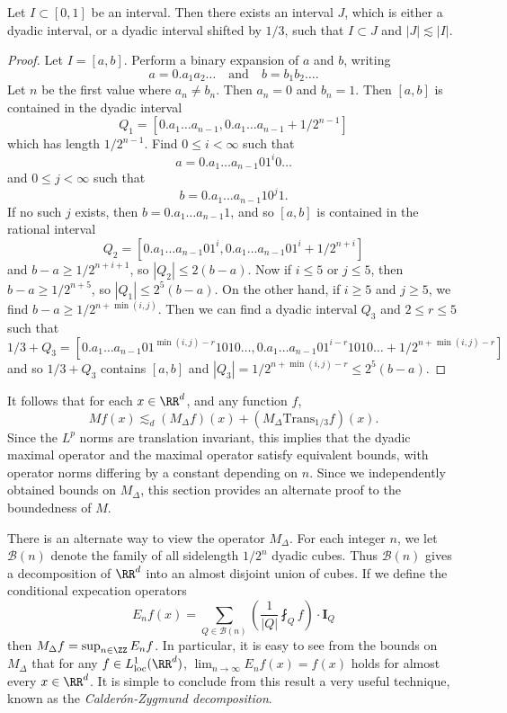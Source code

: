 \begin{lemma}
  Let $I \subset [0,1]$ be an interval. Then there exists an interval $J$, which is either a dyadic interval, or a dyadic interval shifted by $1/3$, such that $I \subset J$ and $|J| \lesssim |I|$.
\end{lemma}
\begin{proof}
  Let $I = [a,b]$. Perform a binary expansion of $a$ and $b$, writing
  \[ a = 0.a_1a_2 \dots \quad\text{and}\quad b = b_1 b_2 \dots. \]
  Let $n$ be the first value where $a_n \neq b_n$. Then $a_n = 0$ and $b_n = 1$. Then $[a,b]$ is contained in the dyadic interval
  \[ Q_1 = \left[ 0.a_1 \dots a_{n-1}, 0.a_1\dots a_{n-1} + 1/2^{n-1} \right] \]
  which has length $1/2^{n-1}$. Find $0 \leq i < \infty$ such that
  \[ a = 0.a_1 \dots a_{n-1} 0 1^i 0 \dots \]
  and $0 \leq j < \infty$ such that
  \[ b = 0.a_1 \dots a_{n-1} 1 0^j 1. \]
  If no such $j$ exists, then $b = 0.a_1 \dots a_{n-1} 1$, and so $[a,b]$ is contained in the rational interval
  \[ Q_2 = \left[ 0.a_1 \dots a_{n-1} 0 1^i, 0.a_1 \dots a_{n-1} 0 1^i + 1/2^{n+i} \right] \]
  and $b - a \geq 1/2^{n+i+1}$, so $|Q_2| \leq 2(b - a)$. Now if $i \leq 5$ or $j \leq 5$, then $b - a \geq 1/2^{n+5}$, so $|Q_1| \leq 2^5(b-a)$. On the other hand, if $i \geq 5$ and $j \geq 5$, we find $b - a \geq 1/2^{n+\min(i,j)}$. Then we can find a dyadic interval $Q_3$ and $2 \leq r \leq 5$ such that
  \[ 1/3 + Q_3 = \left[ 0.a_1 \dots a_{n-1} 0 1^{\min(i,j)-r} 1 0 1 0 \dots, 0.a_1 \dots a_{n-1} 0 1^{i-r} 1 0 1 0 \dots + 1/2^{n+\min(i,j)-r}  \right] \]
  and so $1/3 + Q_3$ contains $[a,b]$ and $|Q_3| = 1/2^{n+\min(i,j)-r} \leq 2^5 (b - a)$.
\end{proof}

It follows that for each $x \in \RR^d$, and any function $f$,
%
\[ Mf(x) \lesssim_d (M_\Delta f)(x) + (M_\Delta \text{Trans}_{1/3} f)(x). \]
%
Since the $L^p$ norms are translation invariant, this implies that the dyadic maximal operator and the maximal operator satisfy equivalent bounds, with operator norms differing by a constant depending on $n$. Since we independently obtained bounds on $M_\Delta$, this section provides an alternate proof to the boundedness of $M$.

There is an alternate way to view the operator $M_\Delta$. For each integer $n$, we let $\mathcal{B}(n)$ denote the family of all sidelength $1/2^n$ dyadic cubes. Thus $\mathcal{B}(n)$ gives a decomposition of $\RR^d$ into an almost disjoint union of cubes. If we define the conditional expecation operators
%
\[ E_n f(x) = \sum_{Q \in \mathcal{B}(n)} \left( \frac{1}{|Q|} \fint_Q f \right) \cdot \mathbf{I}_Q \]
%
then $M_\Delta f = \sup_{n \in \ZZ} E_n f$. In particular, it is easy to see from the bounds on $M_\Delta$ that for any $f \in L^1_{\text{loc}}(\RR^d)$, $\lim_{n \to \infty} E_n f(x) = f(x)$ holds for almost every $x \in \RR^d$. It is simple to conclude from this result a very useful technique, known as the \emph{Calder\'{o}n-Zygmund decomposition}.

